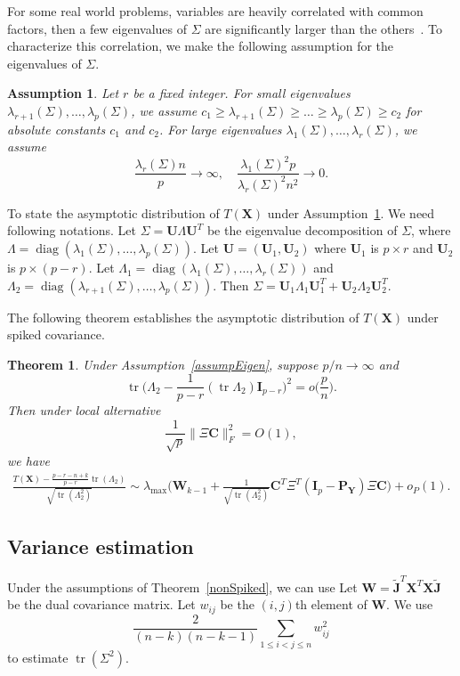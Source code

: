 \documentclass[12pt]{article} %
\DeclareMathOperator{\mytr}{tr}
\DeclareMathOperator{\mydiag}{diag}
\newcommand{\bX}{\mathbf{X}}
\newcommand{\bP}{\mathbf{P}}
\newcommand{\bY}{\mathbf{Y}}
\newcommand{\bJ}{\mathbf{J}}
\newcommand{\bC}{\mathbf{C}}
\newcommand{\bI}{\mathbf{I}}
\newcommand{\bU}{\mathbf{U}}
\newcommand{\bW}{\mathbf{W}}
\newtheorem{assumption}{Assumption}
\newtheorem{theorem}{Theorem}
\theoremstyle{definition}
\begin{document}
For some real world problems, variables are heavily correlated with common factors, then a few eigenvalues of $\Sigma$ are significantly larger than the others~\cite{Ma2015A}.
To characterize this correlation, we make the following assumption for the eigenvalues of $\Sigma$.

\begin{assumption}\label{assumpEigen}
    Let $r$ be a fixed integer.
    For small eigenvalues $\lambda_{r+1}(\Sigma),\ldots,\lambda_p(\Sigma)$, we assume
 $c_1 \geq \lambda_{r+1}(\Sigma) \geq \ldots \geq \lambda_{p}(\Sigma) \geq c_2$ for absolute constants $c_1$ and $c_2$.
    For large eigenvalues $\lambda_1(\Sigma),\ldots,\lambda_r(\Sigma)$,
    we assume 
    $$\frac{\lambda_r(\Sigma) n}{p}\to \infty,\quad
    \frac{\lambda_1(\Sigma)^2 p}{\lambda_r(\Sigma)^2 n^2}\to 0.$$
\end{assumption}


To state the asymptotic distribution of $T(\bX)$ under Assumption~\ref{assumpEigen}.
We need following notations.
Let $\Sigma= \bU\Lambda \bU^T$ be the eigenvalue decomposition of $\Sigma$, where $\Lambda =\mydiag (\lambda_1(\Sigma),\ldots,\lambda_p(\Sigma))$.
Let $\bU=(\bU_1,\bU_2)$ where $\bU_1$ is $p\times r$ and $\bU_2$ is $p\times (p-r)$.
Let $\Lambda_1=\mydiag(\lambda_1(\Sigma),\ldots,\lambda_r(\Sigma))$ and $\Lambda_2=\mydiag(\lambda_{r+1}(\Sigma),\ldots,\lambda_p(\Sigma))$.
Then $\Sigma=\bU_1\Lambda_1 \bU_1^T+\bU_2\Lambda_2 \bU_2^T$.

The following theorem establishes the asymptotic distribution of $T(\bX)$ under spiked covariance.
\begin{theorem}\label{thm1}
    Under Assumption~\eqref{assumpEigen}, suppose $p/n\to \infty$ and
    $$
    \mytr\Big(\Lambda_2-\frac{1}{p-r}(\mytr \Lambda_2)\bI_{p-r}\Big)^2=o\big(\frac{p}{n}\big).
    $$
    Then under local alternative
    \begin{equation*}
        \frac{1}{\sqrt{p}}\|\Xi \bC\|_F^2=O(1),
    \end{equation*}
    we have
    $$
    \begin{aligned}
        \frac{T(\bX)-\frac{p-r-n+k}{p-r}\mytr(\Lambda_2)}{\sqrt{\mytr (\Lambda_2^2)}}
        \sim
        \lambda_{\max}\Big(\bW_{k-1}+\tfrac{1}{\sqrt{\mytr(\Lambda_2^2)}} \bC^T \Xi^T (\bI_p-\bP_{\bY})\Xi \bC\Big)
        +o_P(1).
    \end{aligned}
    $$
\end{theorem}


\subsection{Variance estimation}
Under the assumptions of Theorem~\ref{nonSpiked}, we can use 
Let $\bW=\tilde{\bJ}^T \bX^T \bX \tilde{\bJ}$ be the dual covariance matrix. 
Let $w_{ij}$ be the $(i,j)$th element of $\bW$.
We use
$$\frac{2}{(n-k)(n-k-1)}\sum_{1\leq i<j\leq n}w_{ij}^2$$
to estimate $\mytr(\Sigma^2)$.
\end{document}
